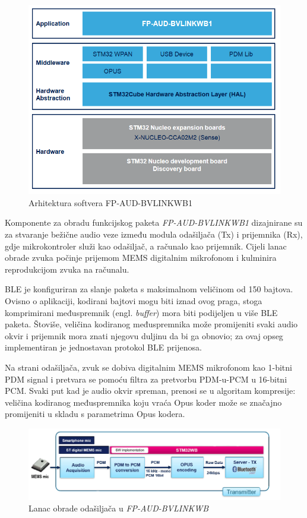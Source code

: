 \begin{figure}[ht]
	\includegraphics[width=\linewidth]{imgs/firmware_software_arch}
	\caption{Arhitektura softvera FP-AUD-BVLINKWB1}
	\label{fig:firmware_software_arch}
\end{figure}

Komponente za obradu funkcijskog paketa \textit{FP-AUD-BVLINKWB1} dizajnirane su za stvaranje bežične audio veze između modula odašiljača (Tx) i prijemnika (Rx), gdje mikrokontroler služi kao odašiljač, a računalo kao prijemnik. Cijeli lanac obrade zvuka počinje prijemom MEMS digitalnim mikrofonom i kulminira reprodukcijom zvuka na računalu.

BLE je konfiguriran za slanje paketa s maksimalnom veličinom od 150 bajtova. Ovisno o aplikaciji, kodirani bajtovi mogu biti iznad ovog praga, stoga komprimirani međuspremnik (engl. \textit{buffer}) mora biti podijeljen u više BLE paketa. Štoviše, veličina kodiranog međuspremnika može promijeniti svaki audio okvir i prijemnik mora znati njegovu duljinu da bi ga obnovio; za ovaj opseg implementiran je jednostavan protokol BLE prijenosa.

Na strani odašiljača, zvuk se dobiva digitalnim MEMS mikrofonom kao 1-bitni PDM signal i pretvara se pomoću filtra za pretvorbu PDM-u-PCM u 16-bitni PCM. Svaki put kad je audio okvir spreman, prenosi se u algoritam kompresije: veličina kodiranog međuspremnika koju vraća Opus koder može se značajno promijeniti u skladu s parametrima Opus kodera.

\begin{figure}[ht]
	\includegraphics[width=\linewidth]{imgs/duplex_chain}
	\caption{Lanac obrade odašiljača u \textit{FP-AUD-BVLINKWB}}
	\label{fig:duplex_chain}
\end{figure}


